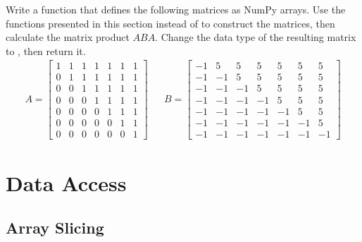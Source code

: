 \begin{problem} %
Write a function that defines the following matrices as NumPy arrays.
Use the functions presented in this section instead of  to construct the matrices, then calculate the matrix product $ABA$.
Change the data type of the resulting matrix to , then return it.
\begin{align*}
A = \left[\begin{array}{rrrrrrr}
1 & 1 & 1 & 1 & 1 & 1 & 1\\
0 & 1 & 1 & 1 & 1 & 1 & 1\\
0 & 0 & 1 & 1 & 1 & 1 & 1\\
0 & 0 & 0 & 1 & 1 & 1 & 1\\
0 & 0 & 0 & 0 & 1 & 1 & 1\\
0 & 0 & 0 & 0 & 0 & 1 & 1\\
0 & 0 & 0 & 0 & 0 & 0 & 1\end{array}\right]
&&
B = \left[\begin{array}{rrrrrrr}
-1 &  5 &  5 &  5 &  5 &  5 &  5\\
-1 & -1 &  5 &  5 &  5 &  5 &  5\\
-1 & -1 & -1 &  5 &  5 &  5 &  5\\
-1 & -1 & -1 & -1 &  5 &  5 &  5\\
-1 & -1 & -1 & -1 & -1 &  5 &  5\\
-1 & -1 & -1 & -1 & -1 & -1 &  5\\
-1 & -1 & -1 & -1 & -1 & -1 & -1\end{array}\right]
\end{align*}
\label{prob:simple3}
\end{problem}

\section*{Data Access} %

\subsection*{Array Slicing} %

